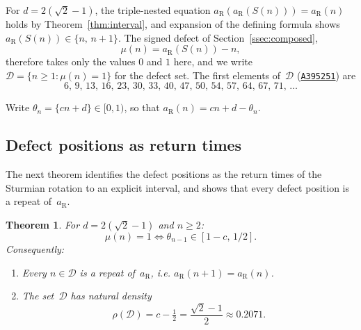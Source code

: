 \documentclass{birkjour}
\newtheorem{theorem}{Theorem}
\theoremstyle{definition}
\theoremstyle{remark}
\newcommand{\frc}[1]{\{ #1 \}}
\begin{document}
For $d=2(\sqrt{2}{-}1)$, the triple-nested equation
$a_{\mathrm{R}}(a_{\mathrm{R}}(S(n)))=a_{\mathrm{R}}(n)$
holds by Theorem~\ref{thm:interval}, and expansion
of the defining formula shows
$a_{\mathrm{R}}(S(n))\in\{n,\,n{+}1\}$. The signed defect
of Section~\ref{ssec:composed},
\[
  \mu(n)=a_{\mathrm{R}}(S(n))-n,
\]
therefore takes only the values $0$ and $1$ here, and we write
$\mathcal{D}=\{n\ge 1:\mu(n)=1\}$ for the defect set.
The first elements of~$\mathcal{D}$
(\href{https://oeis.org/A395251}{\texttt{A395251}}) are
\[
  6,\,9,\,13,\,16,\,23,\,30,\,33,\,40,\,47,\,50,\,
  54,\,57,\,64,\,67,\,71,\,\ldots
\]

Write $\theta_{n}=\frc{cn+d}\in[0,1)$, so that
$a_{\mathrm{R}}(n)=cn+d-\theta_{n}$.

\subsection{Defect positions as return times}

The next theorem identifies the defect positions as the
return times of the Sturmian rotation to an explicit
interval, and shows that every defect position is a repeat
of~$a_{\mathrm{R}}$.

\begin{theorem}\label{thm:absorption}
For $d=2(\sqrt{2}{-}1)$ and $n\ge 2$:
\[
  \mu(n)=1\iff
  \theta_{n-1}\in[1-c,\,1/2].
\]
Consequently:
\begin{enumerate}
\item[\textup{(a)}] Every $n\in\mathcal{D}$ is a repeat
  of~$a_{\mathrm{R}}$, i.e.
  $a_{\mathrm{R}}(n{+}1)=a_{\mathrm{R}}(n)$.
\item[\textup{(b)}] The set~$\mathcal{D}$ has natural
  density
\[
  \rho(\mathcal{D})=c-\tfrac{1}{2}
  =\frac{\sqrt{2}-1}{2}\approx 0.2071.
\]
\end{enumerate}
\end{theorem}
\end{document}
